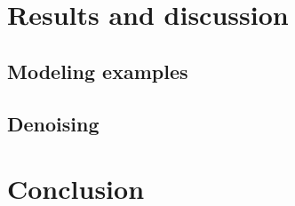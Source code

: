\documentclass[twocolumn]{IEEEtran}
\begin{document}
%
%
%

\section{Results and discussion}

\subsection{Modeling examples}

\subsection{Denoising}

%
%
%
%
%
\section{Conclusion}
%



\end{document}
